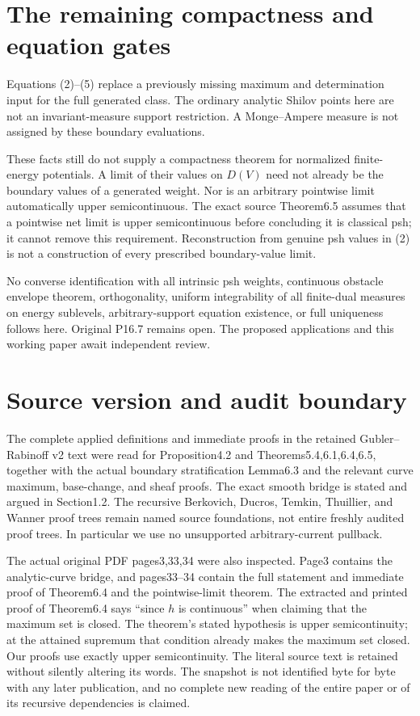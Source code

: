 \documentclass[11pt]{article}
\begin{document}
\section{The remaining compactness and equation gates}
Equations (2)--(5) replace a previously missing maximum and determination
input for the full generated class. The ordinary analytic Shilov points
here are not an invariant-measure support restriction. A Monge--Ampere
measure is not assigned by these boundary evaluations.

These facts still do not supply a compactness theorem for normalized
finite-energy potentials. A limit of their values on $D(V)$ need not
already be the boundary values of a generated weight. Nor is an arbitrary
pointwise limit automatically upper semicontinuous. The exact source
Theorem6.5 assumes that a pointwise net limit is upper semicontinuous
before concluding it is classical psh; it cannot remove this requirement.
Reconstruction from genuine psh values in (2) is not a construction of
every prescribed boundary-value limit.

No converse identification with all intrinsic psh weights, continuous
obstacle envelope theorem, orthogonality, uniform integrability of all
finite-dual measures on energy sublevels, arbitrary-support equation
existence, or full uniqueness follows here. Original P16.7 remains open.
The proposed applications and this working paper await independent review.

\section{Source version and audit boundary}
The complete applied definitions and immediate proofs in the retained
Gubler--Rabinoff v2 text were read for Proposition4.2 and
Theorems5.4,6.1,6.4,6.5, together with the actual boundary stratification
Lemma6.3 and the relevant curve maximum, base-change, and sheaf proofs.
The exact smooth bridge is stated and argued in Section1.2.
The recursive Berkovich, Ducros, Temkin, Thuillier, and Wanner proof trees
remain named source foundations, not entire freshly audited proof trees.
In particular we use no unsupported arbitrary-current pullback.

The actual original PDF pages3,33,34 were also inspected. Page3 contains
the analytic-curve bridge, and pages33--34 contain the full statement and
immediate proof of Theorem6.4 and the pointwise-limit theorem.
The extracted and printed proof of Theorem6.4 says ``since $h$ is continuous'' when
claiming that the maximum set is closed. The theorem's stated hypothesis
is upper semicontinuity; at the attained supremum that condition already
makes the maximum set closed. Our proofs use exactly upper
semicontinuity. The literal source text is retained without silently
altering its words. The snapshot is not identified byte for byte with
any later publication, and no complete new reading of the entire paper
or of its recursive dependencies is claimed.
\end{document}
